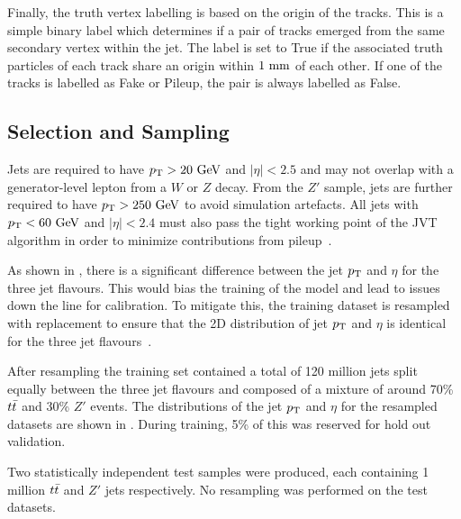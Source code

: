 Finally, the truth vertex labelling is based on the origin of the tracks.
This is a simple binary label which determines if a pair of tracks emerged from the same secondary vertex within the jet.
The label is set to True if the associated truth particles of each track share an origin within $1~\mm$ of each other.
If one of the tracks is labelled as Fake or Pileup, the pair is always labelled as False.

\subsection{Selection and Sampling}

Jets are required to have $\pt > 20~\GeV$ and $|\eta| < 2.5$ and may not overlap with a generator-level lepton from a $W$ or $Z$ decay.
From the $Z'$ sample, jets are further required to have $\pt > 250~\GeV$ to avoid simulation artefacts.
All jets with $\pt < 60~\GeV$ and $|\eta| < 2.4$ must also pass the tight working point of the JVT algorithm in order to minimize contributions from pileup~\cite{JVT}.

As shown in , there is a significant difference between the jet $p_{\text{T}}$ and $\eta$ for the three jet flavours.
This would bias the training of the model and lead to issues down the line for calibration.
To mitigate this, the training dataset is resampled with replacement to ensure that the 2D distribution of jet $p_{\text{T}}$ and $\eta$ is identical for the three jet flavours~\cite{AlexThesis}.

After resampling the training set contained a total of 120 million jets split equally between the three jet flavours and composed of a mixture of around 70\% $t\bar{t}$ and 30\% $Z'$ events.
The distributions of the jet $p_{\text{T}}$ and $\eta$ for the resampled datasets are shown in .
During training, 5\% of this was reserved for hold out validation.

Two statistically independent test samples were produced, each containing 1 million $t\bar{t}$ and $Z'$ jets respectively.
No resampling was performed on the test datasets.


